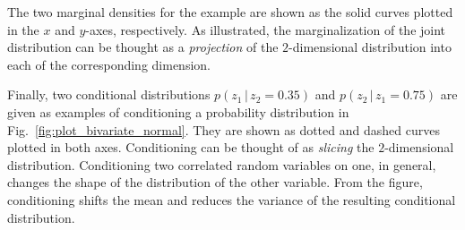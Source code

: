The two marginal densities for the example are shown as the solid curves plotted in the $x$ and $y$-axes, respectively.
As illustrated, the marginalization of the joint distribution can be thought as a \emph{projection} of the $2$-dimensional distribution into each of the corresponding dimension.

Finally, two conditional distributions $p(z_1\,|\,z_2=0.35)$ and $p(z_2\,|\,z_1=0.75)$ are given as examples of conditioning a probability distribution in Fig.~\ref{fig:plot_bivariate_normal}.
They are shown as dotted and dashed curves plotted in both axes.
Conditioning can be thought of as \emph{slicing} the $2$-dimensional distribution.
Conditioning two correlated random variables on one, in general, changes the shape of the distribution of the other variable.
From the figure, conditioning shifts the mean and reduces the variance of the resulting conditional distribution. 

